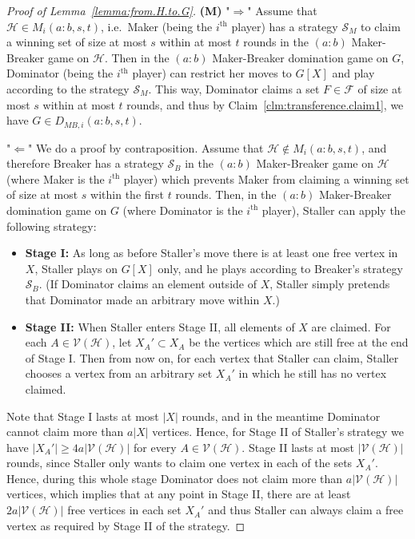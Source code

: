 \documentclass[reqno, 12pt]{amsart}
\numberwithin{equation}{section}
\numberwithin{figure}{section}
\newcommand{\calH}{\mathcal{H}}
\newcommand{\calV}{\mathcal{V}}
\begin{document}
\begin{proof}[Proof of Lemma~\ref{lemma:from.H.to.G}]

\textbf{(M)} 
"$\Rightarrow$" 
Assume that $\mathcal{H} \in M_i(a:b,s,t)$, i.e.~Maker (being the $i^{\text{th}}$ player) has a strategy $\mathcal{S}_M$ to claim a winning set of size at most $s$ within at most $t$ rounds in the $(a:b)$ Maker-Breaker game on $\mathcal{H}$.
Then in the $(a:b)$ Maker-Breaker domination game on $G$, Dominator (being the $i^{\text{th}}$ player) can restrict her moves to $G[X]$ and play according to the strategy $\mathcal{S}_M$. 
This way, Dominator claims a set $F\in \mathcal{F}$ of size at most $s$ within at most $t$ rounds, and thus by Claim~\ref{clm:transference.claim1}, we have $G \in D_{MB,i}(a:b,s,t)$.



"$\Leftarrow$" We do a proof by contraposition. Assume that 
$\mathcal{H} \notin M_i(a:b,s,t)$, and therefore
Breaker has a strategy $\mathcal{S}_B$ 
in the $(a:b)$ Maker-Breaker game on $\calH$ 
(where Maker is the $i^{\text{th}}$ player)
which prevents Maker from claiming a winning set of size
at most $s$ within the first $t$ rounds. Then, in the $(a:b)$ Maker-Breaker domination game on $G$
(where Dominator is the $i^{\text{th}}$ player),
Staller can apply the following strategy:
\begin{itemize}
\item[] \textbf{Stage I:} As long as before Staller's move there is at least one free vertex in $X$,
Staller plays on $G[X]$ only, and he plays according to Breaker's 
strategy $\mathcal{S}_B$. (If Dominator claims an element
outside of $X$, Staller simply pretends that Dominator made an arbitrary move within $X$.)
\item[] \textbf{Stage II:} When Staller enters Stage II, all elements of $X$ are claimed. For each $A\in \calV(\calH)$,
let $X_A'\subset X_A$ be the vertices which are still free at the end of Stage I. Then from now on, for each vertex that Staller can claim,
Staller chooses a vertex from an arbitrary set $X_A'$ in which he still has no vertex claimed.
\end{itemize}

Note that Stage I lasts at most $|X|$
rounds, and in the meantime Dominator cannot claim more than $a|X|$ vertices. Hence, for 
Stage II of Staller's strategy we have $|X_A'|\geq 4a|\calV(\calH)|$ for every $A\in \calV(\calH)$.
Stage II lasts at most $|\calV(\calH)|$ rounds,
since Staller only wants to claim one vertex in each of the sets $X_A'$. Hence, during this whole stage Dominator does not claim more than $a|\calV(\calH)|$ vertices, which implies that at any point in Stage II, there are at least $2a|\calV(\calH)|$
free vertices in each set $X_A'$ and thus
Staller can always claim a free vertex as required by Stage II of the strategy.  



\end{proof}
\end{document}
